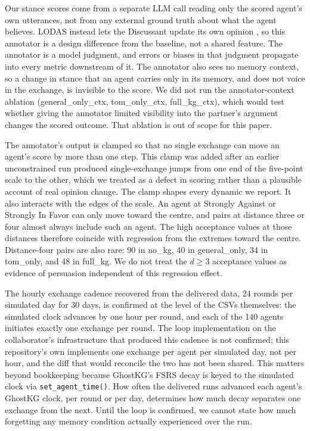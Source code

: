 \documentclass[11pt,a4paper]{article}
\newcommand{\cond}[1]{\textsf{#1}}
\begin{document}
Our stance scores come from a separate LLM call reading only the scored agent's own utterances, not from any external ground truth about what the agent believes. LODAS instead lets the Discussant update its own opinion \citep{cau2025selective}, so this annotator is a design difference from the baseline, not a shared feature. The annotator is a model judgment, and errors or biases in that judgment propagate into every metric downstream of it. The annotator also sees no memory context, so a change in stance that an agent carries only in its memory, and does not voice in the exchange, is invisible to the score. We did not run the annotator-context ablation (\cond{general\_only}\_ctx, \cond{tom\_only}\_ctx, \cond{full\_kg}\_ctx), which would test whether giving the annotator limited visibility into the partner's argument changes the scored outcome. That ablation is out of scope for this paper.

The annotator's output is clamped so that no single exchange can move an agent's score by more than one step. This clamp was added after an earlier unconstrained run produced single-exchange jumps from one end of the five-point scale to the other, which we treated as a defect in scoring rather than a plausible account of real opinion change. The clamp shapes every dynamic we report. It also interacts with the edges of the scale. An agent at Strongly Against or Strongly In Favor can only move toward the centre, and pairs at distance three or four almost always include such an agent. The high acceptance values at those distances therefore coincide with regression from the extremes toward the centre. Distance-four pairs are also rare: 90 in \cond{no\_kg}, 40 in \cond{general\_only}, 34 in \cond{tom\_only}, and 48 in \cond{full\_kg}. We do not treat the $d \geq 3$ acceptance values as evidence of persuasion independent of this regression effect.

The hourly exchange cadence recovered from the delivered data, 24 rounds per simulated day for 30 days, is confirmed at the level of the CSVs themselves: the simulated clock advances by one hour per round, and each of the 140 agents initiates exactly one exchange per round. The loop implementation on the collaborator's infrastructure that produced this cadence is not confirmed; this repository's own  implements one exchange per agent per simulated day, not per hour, and the diff that would reconcile the two has not been shared. This matters beyond bookkeeping because GhostKG's FSRS decay is keyed to the simulated clock via \texttt{set\_agent\_time()}. How often the delivered runs advanced each agent's GhostKG clock, per round or per day, determines how much decay separates one exchange from the next. Until the loop is confirmed, we cannot state how much forgetting any memory condition actually experienced over the run.
\end{document}
